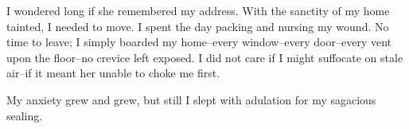\documentclass{article}
\begin{document}
I wondered long if she remembered my address.
With the sanctity of my home tainted, I needed to move.
I spent the day packing and nursing my wound.
No time to leave; I simply boarded my home--every
window--every door--every vent upon the floor--no
crevice left exposed.
I did not care if I might suffocate on stale air--if
it meant her unable to choke me first.


My anxiety grew and grew, but still I slept
with adulation for my sagacious sealing.




















\end{document}
